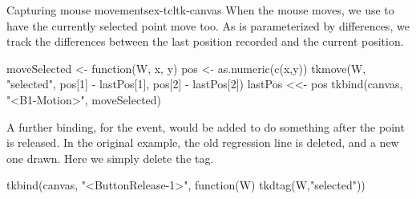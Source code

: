 \begin{example}{Capturing mouse movements}{ex-tcltk-canvas}
When the mouse moves, we use  to have the currently
selected point move too. As  is parameterized by
differences, we track the differences
between the last position recorded and the current position.
\begin{Schunk}
\begin{Sinput}
 moveSelected <- function(W, x, y) {
   pos <- as.numeric(c(x,y))
   tkmove(W, "selected", pos[1] - lastPos[1], 
                         pos[2] - lastPos[2])
   lastPos <<- pos
 }
 tkbind(canvas, "<B1-Motion>", moveSelected)
\end{Sinput}
\end{Schunk}
%
A further binding, for the  event, would be
added to do something after the point is released. In the original
example, the old regression line is deleted, and a new one drawn. Here
we simply delete the  tag.
\begin{Schunk}
\begin{Sinput}
 tkbind(canvas, "<ButtonRelease-1>", 
        function(W) tkdtag(W,"selected"))
\end{Sinput}
\end{Schunk}


\end{example}



